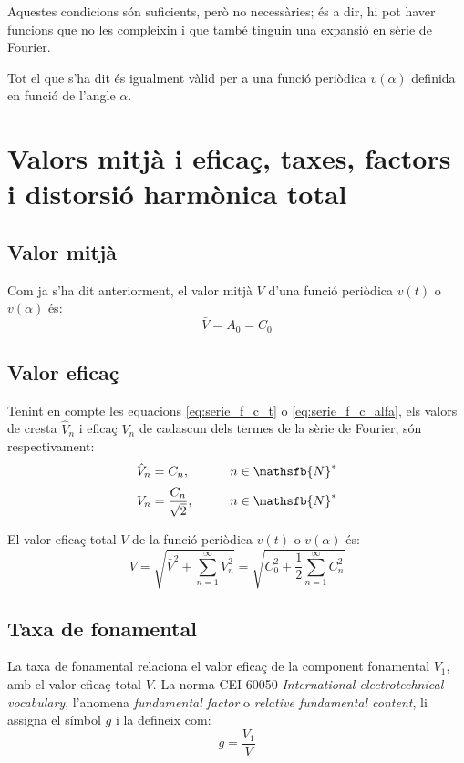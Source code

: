 Aquestes condicions són suficients, però no necessàries; és a dir, hi pot haver funcions que no les compleixin i que també tinguin una expansió en sèrie de Fourier.

Tot el que s'ha dit és igualment vàlid per a una funció periòdica
$v(\alpha)$  definida en funció de l'angle $\alpha$.


\section{Valors mitjà i eficaç, taxes, factors i distorsió harmònica total}\label{sec:four_val_mitja_ef}

\subsection{Valor mitjà}\label{sec:four_val_av}

Com ja s'ha dit anteriorment, el valor mitjà $\bar{V}$ d'una
funció periòdica $v(t)$ o $v(\alpha)$ és:
\begin{equation}
    \bar{V} = A_0 = C_0\label{eq:fourier_ave}
\end{equation}

\subsection{Valor eficaç}\label{sec:four_val_ef}

Tenint en compte les equacions  \eqref{eq:serie_f_c_t} o
\eqref{eq:serie_f_c_alfa}, els valors de cresta $\hat{V}_n$ i eficaç
$V_n$ de cadascun dels termes de la sèrie de Fourier, són respectivament:
\begin{alignat}{2}
    \hat{V}_n &= C_n, &\qquad n \in \mathsfb{N}^*\\[0.5ex]
    V_n &= \frac{C_n}{\sqrt{2}}, &\qquad n \in \mathsfb{N}^*\label{eq:fourier_efi}
\end{alignat}

El valor eficaç total $V$ de  la funció periòdica $v(t)$ o
$v(\alpha)$ és:
\begin{equation}
    V = \sqrt{\bar{V}^2 + \sum_{n=1}^{\infty}V^2_n} =
     \sqrt{C^2_0 + \frac{1}{2} \sum_{n=1}^{\infty}C^2_n}
     \label{eq:val_ef_fourier}
\end{equation}

\subsection{Taxa de fonamental}
La taxa  de fonamental relaciona el valor eficaç de la component fonamental $V_1$, amb el valor eficaç
total $V$. La norma CEI 60050 \textit{International electrotechnical vocabulary}, l'anomena \textit{fundamental factor} o \textit{relative fundamental content}, li assigna el símbol $g$ i la defineix com:
\begin{equation}
    g = \frac{V_1}{V}
\end{equation}

